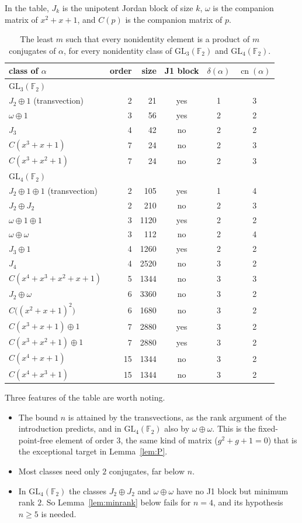 \documentclass[11pt]{amsart}
\theoremstyle{definition}
\theoremstyle{remark}
\newcommand{\F}{\mathbb{F}_2}
\newcommand{\GL}{\mathrm{GL}}
\newcommand{\cn}{\operatorname{cn}}
\begin{document}
In the table, $J_k$ is the unipotent Jordan block of size $k$, $\omega$ is the companion matrix of
$x^2+x+1$, and $C(p)$ is the companion matrix of $p$.

\begin{table}[ht]
\centering
\small
\begin{tabular}{lrrccc}
\toprule
class of $\alpha$ & order & size & J1 block & $\delta(\alpha)$ & $\cn(\alpha)$\\
\midrule
\multicolumn{6}{l}{$\GL_3(\F)$}\\
$J_2\oplus1$ (transvection) & 2 & 21 & yes & 1 & 3\\
$\omega\oplus1$ & 3 & 56 & yes & 2 & 2\\
$J_3$ & 4 & 42 & no & 2 & 2\\
$C(x^3+x+1)$ & 7 & 24 & no & 2 & 3\\
$C(x^3+x^2+1)$ & 7 & 24 & no & 2 & 3\\
\midrule
\multicolumn{6}{l}{$\GL_4(\F)$}\\
$J_2\oplus1\oplus1$ (transvection) & 2 & 105 & yes & 1 & 4\\
$J_2\oplus J_2$ & 2 & 210 & no & 2 & 3\\
$\omega\oplus1\oplus1$ & 3 & 1120 & yes & 2 & 2\\
$\omega\oplus\omega$ & 3 & 112 & no & 2 & 4\\
$J_3\oplus1$ & 4 & 1260 & yes & 2 & 2\\
$J_4$ & 4 & 2520 & no & 3 & 2\\
$C(x^4+x^3+x^2+x+1)$ & 5 & 1344 & no & 3 & 3\\
$J_2\oplus\omega$ & 6 & 3360 & no & 3 & 2\\
$C\big((x^2+x+1)^2\big)$ & 6 & 1680 & no & 3 & 2\\
$C(x^3+x+1)\oplus1$ & 7 & 2880 & yes & 3 & 2\\
$C(x^3+x^2+1)\oplus1$ & 7 & 2880 & yes & 3 & 2\\
$C(x^4+x+1)$ & 15 & 1344 & no & 3 & 2\\
$C(x^4+x^3+1)$ & 15 & 1344 & no & 3 & 2\\
\bottomrule
\end{tabular}
\medskip
\caption{The least $m$ such that every nonidentity element is a product of $m$ conjugates of
$\alpha$, for every nonidentity class of $\GL_3(\F)$ and $\GL_4(\F)$.}
\label{tab:cn}
\end{table}

Three features of the table are worth noting.
\begin{itemize}
\item The bound $n$ is attained by the transvections, as the rank argument of the introduction
predicts, and in $\GL_4(\F)$ also by $\omega\oplus\omega$. This is the fixed-point-free element of
order $3$, the same kind of matrix ($g^2+g+1=0$) that is the exceptional target in
Lemma~\ref{lem:P}.
\item Most classes need only $2$ conjugates, far below $n$.
\item In $\GL_4(\F)$ the classes $J_2\oplus J_2$ and $\omega\oplus\omega$ have no J1 block but
minimum rank $2$. So Lemma~\ref{lem:minrank} below fails for $n=4$, and its hypothesis $n\ge5$
is needed.
\end{itemize}
\end{document}
